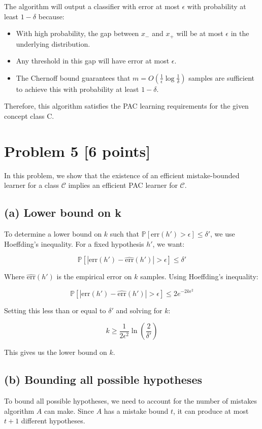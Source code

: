\documentclass{article}
\begin{document}
The algorithm will output a classifier with error at most $\epsilon$ with probability at least $1-\delta$ because:
\begin{itemize}
    \item With high probability, the gap between $x_{-}$ and $x_{+}$ will be at most $\epsilon$ in the underlying distribution.
    \item Any threshold in this gap will have error at most $\epsilon$.
    \item The Chernoff bound guarantees that $m = O(\frac{1}{\epsilon} \log \frac{1}{\delta})$ samples are sufficient to achieve this with probability at least $1-\delta$.
\end{itemize}

Therefore, this algorithm satisfies the PAC learning requirements for the given concept class C.

\section*{Problem 5 [6 points]}
In this problem, we show that the existence of an efficient mistake-bounded learner for a class $\mathcal{C}$ implies an efficient PAC learner for $\mathcal{C}$.

\subsection*{(a) Lower bound on k}
To determine a lower bound on $k$ such that $\mathbb{P}[\text{err}(h') > \epsilon] \leq \delta'$, we use Hoeffding's inequality. For a fixed hypothesis $h'$, we want:

\[\mathbb{P}[|\text{err}(h') - \widehat{\text{err}}(h')| > \epsilon] \leq \delta'\]

Where $\widehat{\text{err}}(h')$ is the empirical error on $k$ samples. Using Hoeffding's inequality:

\[\mathbb{P}[|\text{err}(h') - \widehat{\text{err}}(h')| > \epsilon] \leq 2e^{-2k\epsilon^2}\]

Setting this less than or equal to $\delta'$ and solving for $k$:

\[k \geq \frac{1}{2\epsilon^2} \ln\left(\frac{2}{\delta'}\right)\]

This gives us the lower bound on $k$.

\subsection*{(b) Bounding all possible hypotheses}
To bound all possible hypotheses, we need to account for the number of mistakes algorithm $A$ can make. Since $A$ has a mistake bound $t$, it can produce at most $t+1$ different hypotheses.
\end{document}
